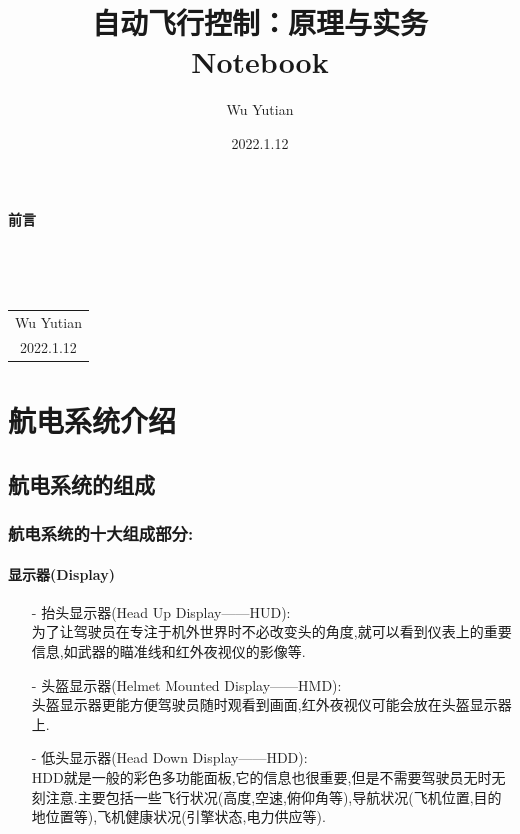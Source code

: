 \documentclass[9pt, oneside]{book}
\title{\Huge{\textbf{自动飞行控制：原理与实务 \\ Notebook}}}
\author{Wu Yutian}
\date{2022.1.12}
\begin{document}
\maketitle

\setcounter{page}{1}

\begin{center}
    \Huge\textbf{前言}
\end{center}~\

~\\
\begin{flushright}     
    \begin{tabular}{c}
        Wu Yutian\\
        2022.1.12
    \end{tabular}
\end{flushright}

\newpage
{}
\setcounter{page}{1}
\tableofcontents
\newpage
\setcounter{page}{1}

\chapter{航电系统介绍}

\section{航电系统的组成}

\subsection{航电系统的十大组成部分:}

\subsubsection{显示器(Display)}

\begin{itemize}
    \item [-] 抬头显示器(Head Up Display——HUD): \\ 
        为了让驾驶员在专注于机外世界时不必改变头的角度,就可以看到仪表上的重要信息,如武器的瞄准线和红外夜视仪的影像等.
    \item [-] 头盔显示器(Helmet Mounted Display——HMD): \\
        头盔显示器更能方便驾驶员随时观看到画面,红外夜视仪可能会放在头盔显示器上.
    \item [-] 低头显示器(Head Down Display——HDD): \\
        HDD就是一般的彩色多功能面板,它的信息也很重要,但是不需要驾驶员无时无刻注意.主要包括一些飞行状况(高度,空速,俯仰角等),导航状况(飞机位置,目的地位置等),飞机健康状况(引擎状态,电力供应等).
\end{itemize}
\end{document}
